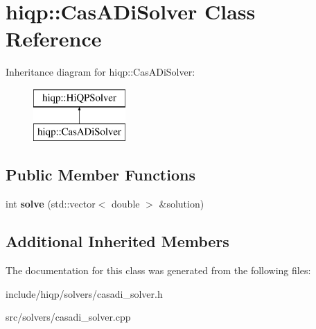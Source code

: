 \hypertarget{classhiqp_1_1CasADiSolver}{\section{hiqp\-:\-:Cas\-A\-Di\-Solver Class Reference}
\label{classhiqp_1_1CasADiSolver}
}
Inheritance diagram for hiqp\-:\-:Cas\-A\-Di\-Solver\-:\begin{figure}[H]
\begin{center}
\leavevmode
\includegraphics[height=2.000000cm]{classhiqp_1_1CasADiSolver}
\end{center}
\end{figure}
\subsection*{Public Member Functions}
\begin{DoxyCompactItemize}
\item 
\hypertarget{classhiqp_1_1CasADiSolver_a30fdfd2289613a3d38fd44a7db266134}{int {\bfseries solve} (std\-::vector$<$ double $>$ \&solution)}\label{classhiqp_1_1CasADiSolver_a30fdfd2289613a3d38fd44a7db266134}

\end{DoxyCompactItemize}
\subsection*{Additional Inherited Members}


The documentation for this class was generated from the following files\-:\begin{DoxyCompactItemize}
\item 
include/hiqp/solvers/casadi\-\_\-solver.\-h\item 
src/solvers/casadi\-\_\-solver.\-cpp\end{DoxyCompactItemize}
